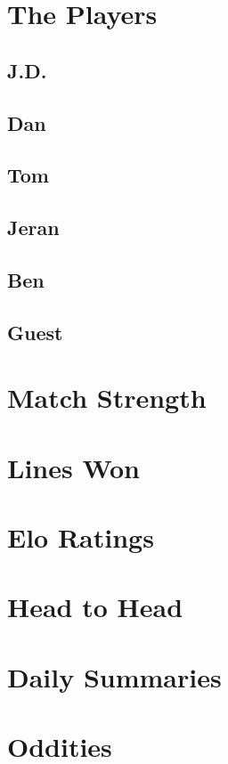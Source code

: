   \chapter{The Players}
    \section{J.D.}
    \section{Dan}
    \section{Tom}
    \section{Jeran}
    \section{Ben}
    \section{Guest}
    
  \chapter{Match Strength}
  \chapter{Lines Won}
  \chapter{Elo Ratings}
  \chapter{Head to Head}
  \chapter{Daily Summaries} %
  \chapter{Oddities}